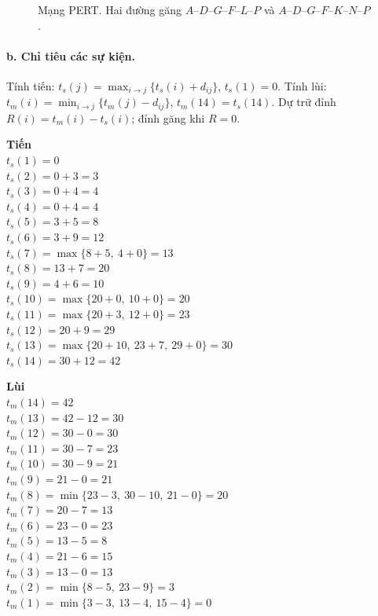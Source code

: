 \documentclass[12pt,a4paper]{article}
\begin{document}
\begin{figure}[H]
{}
\caption{Mạng PERT. Hai đường găng $A$--$D$--$G$--$F$--$L$--$P$ và $A$--$D$--$G$--$F$--$K$--$N$--$P$.}
\end{figure}

\paragraph{b. Chỉ tiêu các sự kiện.}
Tính tiến: $t_s(j)=\max_{i\rightarrow j}\{t_s(i)+d_{ij}\}$, $t_s(1)=0$.
Tính lùi: $t_m(i)=\min_{i\rightarrow j}\{t_m(j)-d_{ij}\}$, $t_m(14)=t_s(14)$.
Dự trữ đỉnh $R(i)=t_m(i)-t_s(i)$; đỉnh găng khi $R=0$.

{\footnotesize
\begin{minipage}[t]{0.49\textwidth}
\textbf{Tiến}\\[1pt]
$t_s(1)=0$\\
$t_s(2)=0+3=3$\\
$t_s(3)=0+4=4$\\
$t_s(4)=0+4=4$\\
$t_s(5)=3+5=8$\\
$t_s(6)=3+9=12$\\
$t_s(7)=\max\{8+5,\ 4+0\}=13$\\
$t_s(8)=13+7=20$\\
$t_s(9)=4+6=10$\\
$t_s(10)=\max\{20+0,\ 10+0\}=20$\\
$t_s(11)=\max\{20+3,\ 12+0\}=23$\\
$t_s(12)=20+9=29$\\
$t_s(13)=\max\{20+10,\ 23+7,\ 29+0\}=30$\\
$t_s(14)=30+12=42$
\end{minipage}
\hfill
\begin{minipage}[t]{0.49\textwidth}
\textbf{Lùi}\\[1pt]
$t_m(14)=42$\\
$t_m(13)=42-12=30$\\
$t_m(12)=30-0=30$\\
$t_m(11)=30-7=23$\\
$t_m(10)=30-9=21$\\
$t_m(9)=21-0=21$\\
$t_m(8)=\min\{23-3,\ 30-10,\ 21-0\}=20$\\
$t_m(7)=20-7=13$\\
$t_m(6)=23-0=23$\\
$t_m(5)=13-5=8$\\
$t_m(4)=21-6=15$\\
$t_m(3)=13-0=13$\\
$t_m(2)=\min\{8-5,\ 23-9\}=3$\\
$t_m(1)=\min\{3-3,\ 13-4,\ 15-4\}=0$
\end{minipage}
}
\end{document}
